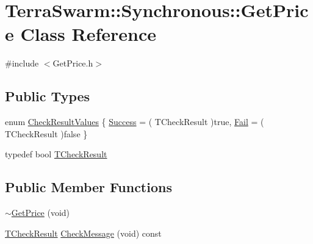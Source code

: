 \hypertarget{class_terra_swarm_1_1_synchronous_1_1_get_price}{\section{Terra\-Swarm\-:\-:Synchronous\-:\-:Get\-Price Class Reference}
\label{class_terra_swarm_1_1_synchronous_1_1_get_price}
}


{\ttfamily \#include $<$Get\-Price.\-h$>$}

\subsection*{Public Types}
\begin{DoxyCompactItemize}
\item 
enum \hyperlink{class_terra_swarm_1_1_synchronous_1_1_get_price_ace12fb126447b011bb7f0e39522e3798}{Check\-Result\-Values} \{ \hyperlink{class_terra_swarm_1_1_synchronous_1_1_get_price_ace12fb126447b011bb7f0e39522e3798aa6e8d01a11a6e2d19be5074d6ab3e779}{Success} = ( T\-Check\-Result )true, 
\hyperlink{class_terra_swarm_1_1_synchronous_1_1_get_price_ace12fb126447b011bb7f0e39522e3798a5b3330fb077085ae5fae8509ffcf64c8}{Fail} = ( T\-Check\-Result )false
 \}
\item 
typedef bool \hyperlink{class_terra_swarm_1_1_synchronous_1_1_get_price_a174c0399b878132f69b36c99ec7a09b4}{T\-Check\-Result}
\end{DoxyCompactItemize}
\subsection*{Public Member Functions}
\begin{DoxyCompactItemize}
\item 
\hyperlink{class_terra_swarm_1_1_synchronous_1_1_get_price_a1727e44cb45249ec35fdcd84b4b0b331}{$\sim$\-Get\-Price} (void)
\item 
\hyperlink{class_terra_swarm_1_1_synchronous_1_1_get_price_a174c0399b878132f69b36c99ec7a09b4}{T\-Check\-Result} \hyperlink{class_terra_swarm_1_1_synchronous_1_1_get_price_a9d05dcfb45a62ffe7891c31fbd1fb4ca}{Check\-Message} (void) const 
\end{DoxyCompactItemize}

